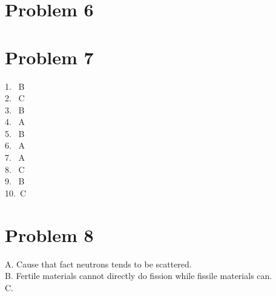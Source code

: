 \documentclass{article}
\begin{document}
\section*{Problem 6}
\section*{Problem 7}
    1. \ B\\
    2. \ C\\
    3. \ B\\
    4. \ A\\
    5. \ B\\
    6. \ A\\
    7. \ A\\
    8. \ C\\
    9. \ B\\
    10.\ C\\ 
\section*{Problem 8}
    A. Cause that fact neutrons tends to be scattered.\\
    B. Fertile materials cannot directly do fission while fissile materials can.\\
    C. 
\end{document}
